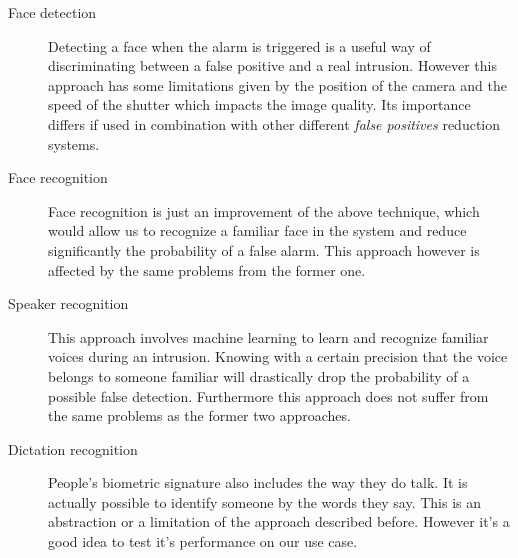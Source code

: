 \begin{description}
  \item[Face detection] Detecting a face when the alarm is triggered is a useful way of
  discriminating between a false positive and a real intrusion. However this approach has some limitations
  given by the position of the camera and the speed of the shutter which impacts the image quality.
  Its importance differs if used in combination with other different \textit{false positives} reduction
  systems.
  \item[Face recognition] Face recognition is just an improvement of the above technique, which would allow
  us to recognize a familiar face in the system and reduce significantly the probability of a false alarm.
  This approach however is affected by the same problems from the former one.
  \item[Speaker recognition] This approach involves machine learning to learn and recognize familiar voices
  during an intrusion. Knowing with a certain precision that the voice belongs to someone familiar will
  drastically drop the probability of a possible false detection. Furthermore this approach does not suffer
  from the same problems as the former two approaches.
  \item[Dictation recognition] People's biometric signature also includes the way they do talk. It is
  actually possible to identify someone by the words they say. This is an abstraction or a limitation of
  the approach described before. However it's a good idea to test it's performance on our use case.
\end{description}
